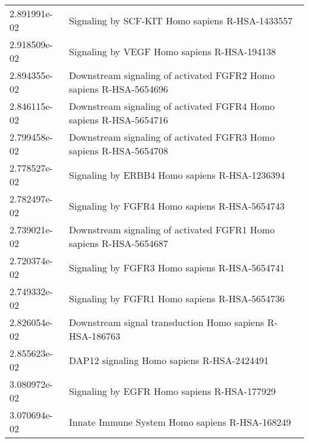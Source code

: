 \begin{longtable}{p{2.4cm}p{14.5cm}}
             2.891991e-02 &                                                                           Signaling by SCF-KIT Homo sapiens R-HSA-1433557 \\
             2.918509e-02 &                                                                               Signaling by VEGF Homo sapiens R-HSA-194138 \\
             2.894355e-02 &                                                        Downstream signaling of activated FGFR2 Homo sapiens R-HSA-5654696 \\
             2.846115e-02 &                                                        Downstream signaling of activated FGFR4 Homo sapiens R-HSA-5654716 \\
             2.799458e-02 &                                                        Downstream signaling of activated FGFR3 Homo sapiens R-HSA-5654708 \\
             2.778527e-02 &                                                                             Signaling by ERBB4 Homo sapiens R-HSA-1236394 \\
             2.782497e-02 &                                                                             Signaling by FGFR4 Homo sapiens R-HSA-5654743 \\
             2.739021e-02 &                                                        Downstream signaling of activated FGFR1 Homo sapiens R-HSA-5654687 \\
             2.720374e-02 &                                                                             Signaling by FGFR3 Homo sapiens R-HSA-5654741 \\
             2.749332e-02 &                                                                             Signaling by FGFR1 Homo sapiens R-HSA-5654736 \\
             2.826054e-02 &                                                                  Downstream signal transduction Homo sapiens R-HSA-186763 \\
             2.855623e-02 &                                                                                DAP12 signaling Homo sapiens R-HSA-2424491 \\
             3.080972e-02 &                                                                               Signaling by EGFR Homo sapiens R-HSA-177929 \\
             3.070694e-02 &                                                                            Innate Immune System Homo sapiens R-HSA-168249 \\

\end{longtable}
